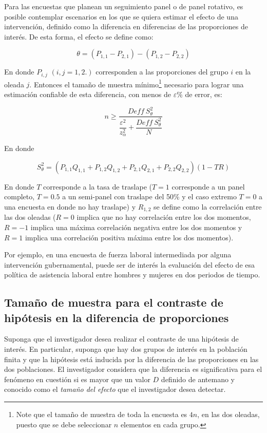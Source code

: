 \documentclass[
  10pt,
  spanish,
]{book}
\begin{document}
Para las encuestas que planean un seguimiento panel o de panel rotativo, es posible contemplar escenarios en los que se quiera estimar el efecto de una intervención, definido como la diferencia en diferencias de las proporciones de interés. De esta forma, el efecto se define como:

\[
\theta = (P_{1,1}-P_{2,1})-(P_{1,2}-P_{2, 2})
\]

En donde \(P_{i,j}\) \((i, j = 1, 2.)\) corresponden a las proporciones del grupo \(i\) en la oleada \(j\). Entonces el tamaño de muestra mínimo\footnote{Note que el tamaño de muestra de toda la encuesta es \(4n\), en las dos oleadas, puesto que se debe seleccionar \(n\) elementos en cada grupo.} necesario para lograr una estimación confiable de esta diferencia, con menos de \(\varepsilon \%\) de error, es:

\[
n \geq \dfrac{Deff \ S^2_{\theta}}{\dfrac{\varepsilon^2}{z_{\alpha}^2}+\dfrac{Deff \ S^2_{\theta}}{N}}
\]

En donde

\[
S^2_{\theta} = (P_{1,1}Q_{1,1}+P_{1,2}Q_{1,2}+P_{2,1}Q_{2,1}+P_{2,2}Q_{2,2})(1-TR)
\]

En donde \(T\) corresponde a la tasa de traslape (\(T=1\) corresponde a un panel completo, \(T=0.5\) a un semi-panel con traslape del 50\% y el caso extremo \(T=0\) a una encuesta en donde no hay traslape) y \(R_{1,2}\) se define como la correlación entre las dos oleadas (\(R=0\) implica que no hay correlación entre los dos momentos, \(R=-1\) implica una máxima correlación negativa entre los dos momentos y \(R=1\) implica una correlación positiva máxima entre los dos momentos).

Por ejemplo, en una encuesta de fuerza laboral intermediada por alguna intervención gubernamental, puede ser de interés la evaluación del efecto de esa política de asistencia laboral entre hombres y mujeres en dos periodos de tiempo.

\hypertarget{tamauxf1o-de-muestra-para-el-contraste-de-hipuxf3tesis-en-la-diferencia-de-proporciones}{%
\subsection{Tamaño de muestra para el contraste de hipótesis en la diferencia de proporciones}\label{tamauxf1o-de-muestra-para-el-contraste-de-hipuxf3tesis-en-la-diferencia-de-proporciones}}

Suponga que el investigador desea realizar el contraste de una hipótesis de interés. En particular, suponga que hay dos grupos de interés en la población finita y que la hipótesis está inducida por la diferencia de las proporciones en las dos poblaciones. El investigador considera que la diferencia es significativa para el fenómeno en cuestión si es mayor que un valor \(D\) definido de antemano y conocido como el \emph{tamaño del efecto} que el investigador desea detectar.
\end{document}
